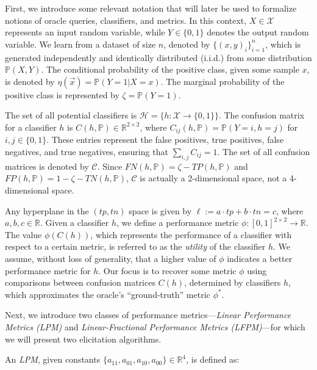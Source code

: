 \documentclass[
  letterpaper,
  numbers=noenddot,
  DIV=11]{scrreprt}
\theoremstyle{plain}
\theoremstyle{definition}
\theoremstyle{plain}
\theoremstyle{remark}
\begin{document}
First, we introduce some relevant notation that will later be used to
formalize notions of oracle queries, classifiers, and metrics. In this
context, \(X \in \mathcal{X}\) represents an input random variable,
while \(Y \in \{0, 1\}\) denotes the output random variable. We learn
from a dataset of size \(n\), denoted by \(\{(x, y)_i\}^n_{i=1}\), which
is generated independently and identically distributed (i.i.d.) from
some distribution \(\mathbb{P}(X, Y)\). The conditional probability of
the positive class, given some sample \(x\), is denoted by
\(\eta(\vec{x}) = \mathbb{P}(Y=1 | X=x)\). The marginal probability of
the positive class is represented by \(\zeta = \mathbb{P}(Y=1)\).

The set of all potential classifiers is
\(\mathcal{H} = \{h : \mathcal{X} \rightarrow \{0,1\}\}\). The confusion
matrix for a classifier \(h\) is
\(C(h, \mathbb{P}) \in \mathbb{R}^{2 \times 2}\), where
\(C_{ij}(h, \mathbb{P}) = \mathbb{P}(Y=i, h=j)\) for
\(i, j \in \{0,1\}\). These entries represent the false positives, true
positives, false negatives, and true negatives, ensuring that
\(\sum_{i,j}C_{ij}=1\). The set of all confusion matrices is denoted by
\(\mathcal{C}\). Since \(FN(h, \mathbb{P}) = \zeta - TP(h, \mathbb{P})\)
and \(FP(h, \mathbb{P}) = 1 - \zeta - TN(h, \mathbb{P})\),
\(\mathcal{C}\) is actually a 2-dimensional space, not a 4-dimensional
space.

Any hyperplane in the \((tp, tn)\) space is given by
\(\ell := a \cdot tp + b \cdot tn = c\), where
\(a, b, c \in \mathbb{R}\). Given a classifier \(h\), we define a
performance metric
\(\phi : [0, 1]^{2 \times 2} \rightarrow \mathbb{R}\). The value
\(\phi(C(h))\), which represents the performance of a classifier with
respect to a certain metric, is referred to as the \emph{utility} of the
classifier \(h\). We assume, without loss of generality, that a higher
value of \(\phi\) indicates a better performance metric for \(h\). Our
focus is to recover some metric \(\phi\) using comparisons between
confusion matrices \(C(h)\), determined by classifiers \(h\), which
approximates the oracle's ``ground-truth'' metric \(\phi^*\).

Next, we introduce two classes of performance metrics---\emph{Linear
Performance Metrics (LPM)} and \emph{Linear-Fractional Performance
Metrics (LFPM)}---for which we will present two elicitation algorithms.

An \emph{LPM}, given constants
\(\{a_{11}, a_{01}, a_{10}, a_{00}\} \in \mathbb{R}^{4}\), is defined
as:
\end{document}
